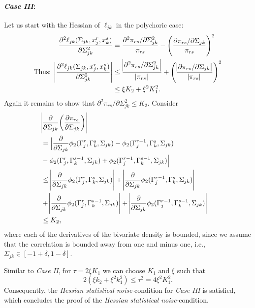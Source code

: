 \begin{condition}
    \paragraph{\textit{Case III}:} Let us start with the Hessian of \(\ell_{jk}\) in the polychoric case:
    \begin{equation}\label{hessian_case3}
        \begin{split}
            \frac{\partial^2 \ell_{jk}(\Sigma_{jk}, x_j^r,x_k^s)}{\partial \Sigma_{jk}^{2}} &= \frac{\partial^2 \pi_{rs}/\partial \Sigma_{jk}^{2}}{\pi_{rs}} - \Bigg(\frac{\partial \pi_{rs}/\partial \Sigma_{jk}}{\pi_{rs}}\Bigg)^2 \\
            \text{Thus: } \abs{\frac{\partial^2 \ell_{jk}(\Sigma_{jk}, x_j^r,x_k^s)}{\partial \Sigma_{jk}^{2}}} &\leq \frac{\abs{\partial^2 \pi_{rs}/\partial \Sigma_{jk}^{2}}}{\abs{\pi_{rs}}} + \Bigg(\frac{\abs{\partial \pi_{rs}/\partial \Sigma_{jk}}}{\abs{\pi_{rs}}} \Bigg)^2 \\
            &\leq \xi K_2 + \xi^2K_1^2.
        \end{split}
    \end{equation}
    Again it remains to show that $\partial^2 \pi_{rs}/\partial \Sigma_{jk}^{2} \leq K_2$. Consider
    \begin{equation*}
        \begin{split}
        \lefteqn{\abs{\frac{\partial}{\partial \Sigma_{jk}}\bigg(\frac{\partial \pi_{rs}}{\partial \Sigma_{jk}}\bigg)}} \\
        &= \Big\lvert \frac{\partial}{\partial \Sigma_{jk}}\phi_2({\Gamma}_j^r, {\Gamma}_k^s, \Sigma_{jk}) - \phi_2({\Gamma}_j^{r-1}, {\Gamma}_k^s, \Sigma_{jk}) \\
        &- \phi_2({\Gamma}_j^r, {\Gamma}_k^{s-1}, \Sigma_{jk}) + \phi_2({\Gamma}_j^{r-1}, {\Gamma}_k^{s-1}, \Sigma_{jk})\Big\rvert \\
        &\leq \abs{\frac{\partial}{\partial \Sigma_{jk}}\phi_2({\Gamma}_j^r, {\Gamma}_k^s, \Sigma_{jk})} + \abs{\frac{\partial}{\partial \Sigma_{jk}}\phi_2({\Gamma}_j^{r-1}, {\Gamma}_k^s, \Sigma_{jk})} \\
        &+ \abs{\frac{\partial}{\partial \Sigma_{jk}}\phi_2({\Gamma}_j^r, {\Gamma}_k^{s-1}, \Sigma_{jk})} + \abs{\frac{\partial}{\partial \Sigma_{jk}}\phi_2({\Gamma}_j^{r-1}, {\Gamma}_k^{s-1}, \Sigma_{jk})} \\
        &\leq K_2,
        \end{split}
    \end{equation*}
    where each of the derivatives of the bivariate density is bounded, since we assume that the correlation is bounded away from one and minus one, i.e., \(\Sigma_{jk} \in [-1 + \delta, 1 - \delta]\).

    Similar to \textit{Case II}, for $\tau = 2\xi K_1$ we can choose $K_1$ and $\xi$ such that \[2(\xi k_2 + \xi^2 k_1^2) \leq \tau^2 = 4\xi^2 K_1^2.\]
    Consequently, the \textit{Hessian statistical noise}-condition for \textit{Case III} is satisfied, which concludes the proof of the \textit{Hessian statistical noise}-condition.
\end{condition}


